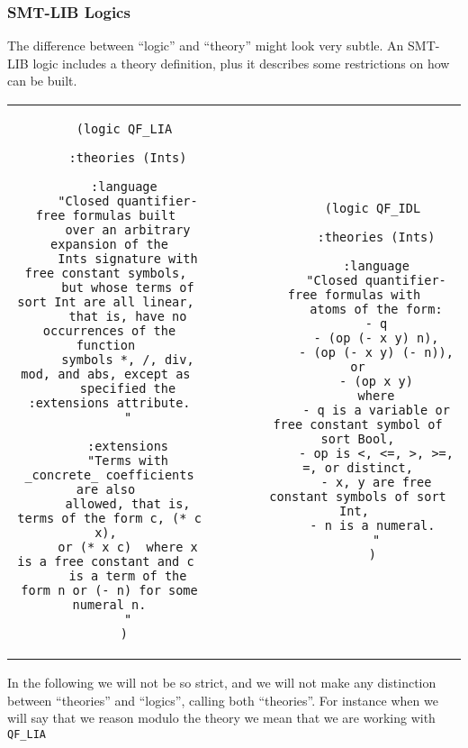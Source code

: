 \begin{frame}[fragile]
  \frametitle{SMT-LIB Logics}

  \scriptsize
  The difference between ``logic'' and ``theory'' might look very subtle. 
  An SMT-LIB logic includes a theory definition, plus it describes some
  restrictions on how \formulae can be built. \pause

  \vfill
  \hspace{-25pt}
  \begin{tabular}{ccc}
  \begin{minipage}{.4\textwidth}
    \tiny
    \begin{verbatim}
    (logic QF_LIA
     
     :theories (Ints)
     
     :language 
     "Closed quantifier-free formulas built 
     over an arbitrary expansion of the
     Ints signature with free constant symbols, 
     but whose terms of sort Int are all linear, 
     that is, have no occurrences of the function 
     symbols *, /, div, mod, and abs, except as 
     specified the :extensions attribute.
     "
      
     :extensions
     "Terms with _concrete_ coefficients are also 
     allowed, that is, terms of the form c, (* c x), 
     or (* x c)  where x is a free constant and c 
     is a term of the form n or (- n) for some numeral n.
     "
    )
    \end{verbatim}
  \end{minipage}
  & ~~~~ & \pause
  \begin{minipage}{.4\textwidth}
    \tiny
    \begin{verbatim}
    (logic QF_IDL

     :theories (Ints)

     :language
     "Closed quantifier-free formulas with 
     atoms of the form:
     - q
     - (op (- x y) n),
     - (op (- x y) (- n)), or
     - (op x y)
     where
     - q is a variable or free constant symbol of sort Bool,
     - op is <, <=, >, >=, =, or distinct,
     - x, y are free constant symbols of sort Int, 
     - n is a numeral. 
     "
    )
    \end{verbatim}
  \end{minipage}
  \end{tabular}

  \vfill
  \pause

  In the following we will not be so strict, and we will not make any distinction 
  between ``theories'' and ``logics'', calling both ``theories''. \pause 
  For instance when we will say that we reason modulo the theory \Lia we mean 
  that we are working with {\tt QF\_LIA} \formulae

\end{frame}

